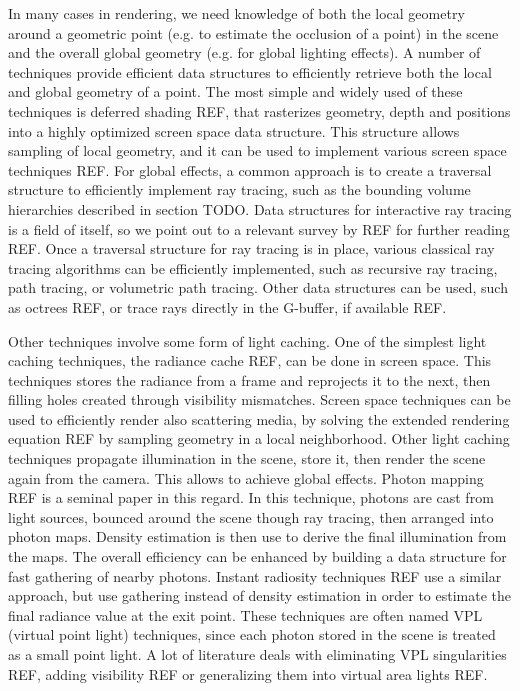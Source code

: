 In many cases in rendering, we need knowledge of both the local geometry around a geometric point (e.g. to estimate the occlusion of a point) in the scene and the overall global geometry (e.g. for global lighting effects). A number of techniques provide efficient data structures to efficiently retrieve both the local and global geometry of a point. The most simple and widely used of these techniques is deferred shading REF, that rasterizes geometry, depth and positions into a highly optimized screen space data structure. This structure allows sampling of local geometry, and it can be used to implement various screen space techniques REF. For global effects, a common approach is to create a traversal structure to efficiently implement ray tracing, such as the bounding volume hierarchies described in section TODO. Data structures for interactive ray tracing is a field of itself, so we point out to a relevant survey by REF for further reading REF. Once a traversal structure for ray tracing is in place, various classical ray tracing algorithms can be efficiently implemented, such as recursive ray tracing, path tracing, or volumetric path tracing. Other data structures can be used, such as octrees REF, or trace rays directly in the G-buffer, if available REF.

Other techniques involve some form of light caching. One of the simplest light caching techniques, the radiance cache REF, can be done in screen space. This techniques stores the radiance from a frame and reprojects it to the next, then filling holes created through visibility mismatches. Screen space techniques can be used to efficiently render also scattering media, by solving the extended rendering equation REF by sampling geometry in a local neighborhood. Other light caching techniques propagate illumination in the scene, store it, then render the scene again from the camera. This allows to achieve global effects. Photon mapping REF is a seminal paper in this regard. In this technique, photons are cast from light sources, bounced around the scene though ray tracing, then arranged into photon maps. Density estimation is then use to derive the final illumination from the maps. The overall efficiency can be enhanced by building a data structure for fast gathering of nearby photons. Instant radiosity techniques REF use a similar approach, but use gathering instead of density estimation in order to estimate the final radiance value at the exit point. These techniques are often named VPL (virtual point light) techniques, since each photon stored in the scene is treated as a small point light. A lot of literature deals with eliminating VPL singularities REF, adding visibility REF or generalizing them into virtual area lights REF.

